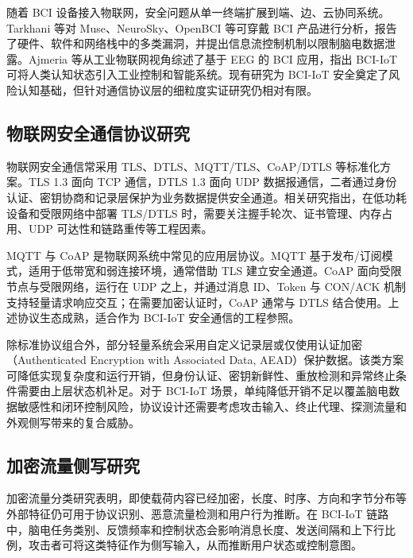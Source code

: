 随着 BCI 设备接入物联网，安全问题从单一终端扩展到端、边、云协同系统。Tarkhani 等对 Muse、NeuroSky、OpenBCI 等可穿戴 BCI 产品进行分析，报告了硬件、软件和网络栈中的多类漏洞，并提出信息流控制机制以限制脑电数据泄露\cite{tarkhani2022wearablebci}。Ajmeria 等从工业物联网视角综述了基于 EEG 的 BCI 应用，指出 BCI-IoT 可将人类认知状态引入工业控制和智能系统\cite{ajmeria2023iiotbci}。现有研究为 BCI-IoT 安全奠定了风险认知基础，但针对通信协议层的细粒度实证研究仍相对有限。

\subsection{物联网安全通信协议研究}
物联网安全通信常采用 TLS、DTLS、MQTT/TLS、CoAP/DTLS 等标准化方案。TLS 1.3 面向 TCP 通信，DTLS 1.3 面向 UDP 数据报通信，二者通过身份认证、密钥协商和记录层保护为业务数据提供安全通道\cite{rfc8446,rfc9147}。相关研究指出，在低功耗设备和受限网络中部署 TLS/DTLS 时，需要关注握手轮次、证书管理、内存占用、UDP 可达性和链路重传等工程因素\cite{restuccia2020lowpower,nedergaard2023coapsecure}。

MQTT 与 CoAP 是物联网系统中常见的应用层协议。MQTT 基于发布/订阅模式，适用于低带宽和弱连接环境，通常借助 TLS 建立安全通道\cite{mqtt311,zheng2023mqtttamarin}。CoAP 面向受限节点与受限网络，运行在 UDP 之上，并通过消息 ID、Token 与 CON/ACK 机制支持轻量请求响应交互\cite{rfc7252,ren2020coapcongestion}；在需要加密认证时，CoAP 通常与 DTLS 结合使用\cite{rfc9147,nedergaard2023coapsecure}。上述协议生态成熟，适合作为 BCI-IoT 安全通信的工程参照。

除标准协议组合外，部分轻量系统会采用自定义记录层或仅使用认证加密（Authenticated Encryption with Associated Data, AEAD）保护数据\cite{rfc5116}。该类方案可降低实现复杂度和运行开销，但身份认证、密钥新鲜性、重放检测和异常终止条件需要由上层状态机补足。对于 BCI-IoT 场景，单纯降低开销不足以覆盖脑电数据敏感性和闭环控制风险，协议设计还需要考虑攻击输入、终止代理、探测流量和外观侧写带来的复合威胁。

\subsection{加密流量侧写研究}
加密流量分类研究表明，即使载荷内容已经加密，长度、时序、方向和字节分布等外部特征仍可用于协议识别、恶意流量检测和用户行为推断\cite{velan2015survey,alwhbi2024encrypted,hou2024encmalware,fu2025encryptedtraffic}。在 BCI-IoT 链路中，脑电任务类别、反馈频率和控制状态会影响消息长度、发送间隔和上下行比例，攻击者可将这类特征作为侧写输入，从而推断用户状态或控制意图。

